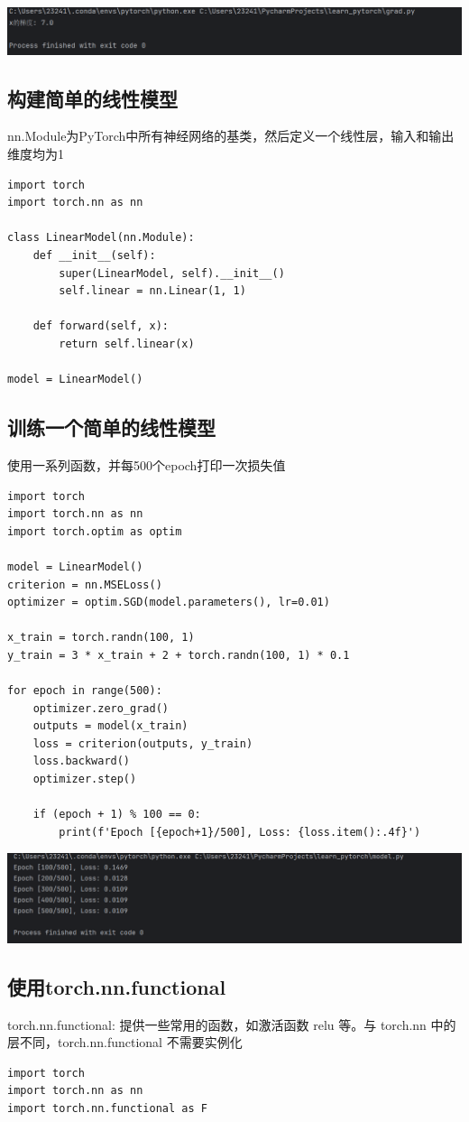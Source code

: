 \documentclass[UTF8,a4paper]{ctexart}
\begin{document}
\begin{sloppypar}
	\includegraphics[width = 16cm]{11}
	
	
	\subsection{构建简单的线性模型}
	nn.Module为PyTorch中所有神经网络的基类，然后定义一个线性层，输入和输出维度均为1
\begin{lstlisting}
import torch
import torch.nn as nn

class LinearModel(nn.Module):
    def __init__(self):
        super(LinearModel, self).__init__()
        self.linear = nn.Linear(1, 1)

    def forward(self, x):
        return self.linear(x)

model = LinearModel()

\end{lstlisting}
	
	
	\subsection{训练一个简单的线性模型}
	使用一系列函数，并每500个epoch打印一次损失值
	\begin{lstlisting}
import torch
import torch.nn as nn
import torch.optim as optim

model = LinearModel()
criterion = nn.MSELoss() 
optimizer = optim.SGD(model.parameters(), lr=0.01) 

x_train = torch.randn(100, 1)
y_train = 3 * x_train + 2 + torch.randn(100, 1) * 0.1

for epoch in range(500):
    optimizer.zero_grad() 
    outputs = model(x_train)
    loss = criterion(outputs, y_train)
    loss.backward()
    optimizer.step()

    if (epoch + 1) % 100 == 0:
        print(f'Epoch [{epoch+1}/500], Loss: {loss.item():.4f}')
	\end{lstlisting}
	
	\includegraphics[width = 16cm]{13}
	
	\subsection{使用torch.nn.functional}
	torch.nn.functional: 提供一些常用的函数，如激活函数 relu 等。与 torch.nn 中的层不同，torch.nn.functional 不需要实例化
	\begin{lstlisting}
import torch
import torch.nn as nn
import torch.nn.functional as F


\end{lstlisting}
\end{sloppypar}
\end{document}
